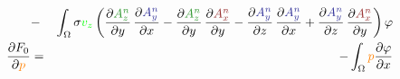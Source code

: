 \documentclass[smallextended]{svjour3}       %
\begin{document}
\begin{eqnarray}
			\nonumber \\
			& - &\int_{\Omega} \sigma \textcolor{gre}{v_z} \left(\frac{\partial \textcolor{darkgre}{A_z^n}}{\partial y}\,\frac{\partial \textcolor{darkblu}{A_y^n}}{\partial x} - \frac{\partial \textcolor{darkgre}{A_z^n}}{\partial y}\,\frac{\partial \textcolor{darkred}{A_x^n}}{\partial y} - \frac{\partial \textcolor{darkblu}{A_y^n}}{\partial z}\,\frac{\partial \textcolor{darkblu}{A_y^n}}{\partial x} + \frac{\partial \textcolor{darkblu}{A_y^n}}{\partial z}\,\frac{\partial \textcolor{darkred}{A_x^n}}{\partial y} \right) \varphi \\			
			\frac{\partial F_0}{\partial \textcolor{orange}{p}} & = &
		- \int_{\Omega} \textcolor{orange}{p} \frac{\partial \varphi}{\partial x}
			\end{eqnarray}
			
\end{document}
